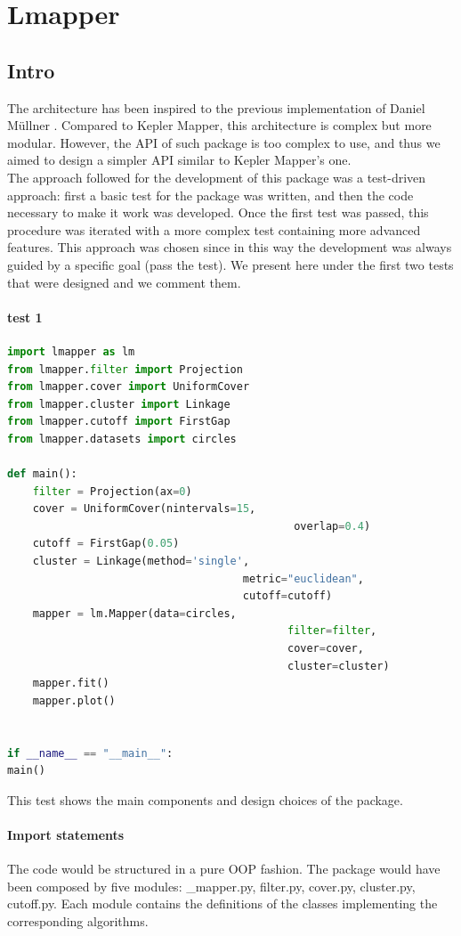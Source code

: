 \section{Lmapper}
\subsection{Intro}
The architecture has been inspired to the previous implementation of Daniel M\"ullner \cite{pythonmapper}. Compared to Kepler Mapper, this architecture is complex but more modular. However, the API of such package is too complex to use, and thus we aimed to design a simpler API similar to Kepler Mapper's one.\\
The approach followed for the development of this package was a test-driven approach: first a basic test for the package was written, and then the code necessary to make it work was developed. Once the first test was passed, this procedure was iterated with a more complex test containing more advanced features. This approach was chosen since in this way the development was always guided by a specific goal (pass the test).
We present here under the first two tests that were designed and we comment them.

\paragraph{test 1}
\begin{lstlisting}[language=Python, caption=First test for Mapper]
import lmapper as lm
from lmapper.filter import Projection
from lmapper.cover import UniformCover
from lmapper.cluster import Linkage
from lmapper.cutoff import FirstGap
from lmapper.datasets import circles

def main():
	filter = Projection(ax=0)
	cover = UniformCover(nintervals=15,
										     overlap=0.4)
	cutoff = FirstGap(0.05)
	cluster = Linkage(method='single',
									 metric="euclidean",
									 cutoff=cutoff)
	mapper = lm.Mapper(data=circles,
											filter=filter,
	 										cover=cover,
											cluster=cluster)
	mapper.fit()
	mapper.plot()


if __name__ == "__main__":
main()

\end{lstlisting}
This test shows the main components and design choices of the package. 
\paragraph{Import statements}
The code would be structured in a pure OOP fashion. The package would have been composed by five modules: \_mapper.py, filter.py, cover.py, cluster.py, cutoff.py.  Each module contains the definitions of the classes implementing the corresponding algorithms. 
